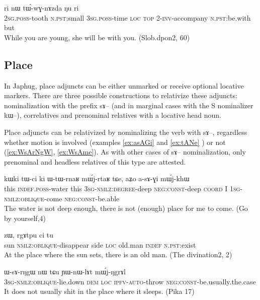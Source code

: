 \documentclass[oldfontcommands,oneside,a4paper,11pt]{article}
\newcommand{\ipa}[1]{{\phon #1}} %
\begin{document}
\begin{exe}
   \ex \label{ex:WraN2}
 \gll [\ipa{nɤ-ɕɣa}   	\ipa{xtɕi}]   	\ipa{ɯ-raŋ}   	\ipa{ri}   	\ipa{nɯ}   	\ipa{tɯ́-wɣ-nɤzda}   	\ipa{ŋu}   	\ipa{ri}   \\
 \textsc{2sg.poss}-tooth \textsc{n.pst}:small \textsc{3sg.poss}-time \textsc{loc} \textsc{top} 2-\textsc{inv}-accompany \textsc{n.pst}:be.with but \\
\glt While you are young, she will be with you. (Slob.dpon2, 60)
\end{exe}

 



\subsection{Place} \label{sec:rel:place}
In Japhug, place adjuncts can be either unmarked or receive optional locative markers. %
There are three possible constructions to relativize these adjuncts: nominalization with the prefix \ipa{sɤ}-- (and in marginal cases with the S nominalizer \ipa{kɯ--}), correlatives and prenominal relatives with a locative head noun.

Place adjuncts can be relativized by nominalizing the verb with \ipa{sɤ}--, regardless whether motion is involved (examples \ref{ex:asAGi} and \ref{ex:tANe} )  or not (\ref{ex:WsArNgW}, \ref{ex:WsAme}). As with other cases of \ipa{sɤ}-- nominalization, only prenominal and headless relatives of this type are attested.

\begin{exe}
   \ex \label{ex:asAGi}
 \gll
\ipa{kɯki}   	\ipa{tɯ-ci}   	\ipa{ki}   	\ipa{ɯ-tɯ-rnaʁ}   	\ipa{mɯ́j-rtaʁ}   	\ipa{tɕe,}   	\ipa{aʑo}   	\ipa{a-sɤ-ɣi}   	\ipa{mɯ́j-khɯ}   \\
this \textsc{indef.poss}-water this \textsc{3sg-nmlz:degree}-deep \textsc{neg:const}-deep \textsc{coord} I \textsc{1sg-nmlz:oblique}-come \textsc{neg:const}-be.able \\
\glt The water is not deep enough, there is not (enough) place for me to come. (Go by yourself,4)
\end{exe}


\begin{exe}
   \ex \label{ex:tANe}
 \gll [\ipa{tɤŋe}   	\ipa{sɤ-ɕqhlɤt}]   	\ipa{pɕoʁ}   	\ipa{zɯ,}   	\ipa{rgɤtpu}   	\ipa{ci}   	\ipa{tu}   \\
sun \textsc{nmlz:oblique}-disappear side \textsc{loc} old.man \textsc{indef} \textsc{n.pst}:exist \\
\glt At the place where the sun sets, there is an old man. (The divination2, 2)
\end{exe}
\begin{exe}
   \ex \label{ex:WsArNgW}
 \gll
\ipa{ɯ-sɤ-rŋgɯ}   	\ipa{nɯ} \ipa{tɕu}   	\ipa{ɲɯ-nɯ-lɤt}   	\ipa{mɯ́j-ŋgrɤl}   \\
\textsc{3sg-nmlz:oblique}-lie.down \textsc{dem} \textsc{loc} \textsc{ipfv-auto}-throw \textsc{neg:const}-be.usually.the.case \\
\glt  It  does not usually shit in the place where it sleeps. (Pika 17)
\end{exe}
\end{document}

